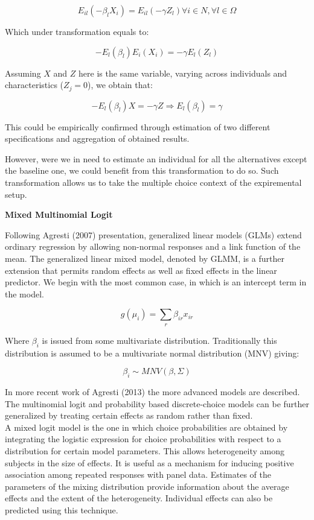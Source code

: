 \documentclass[12pt,]{article}
\begin{document}
\begin{equation}
E_{il} (- \beta_l X_i) = E_{il} (- \gamma Z_l) \forall i \in N, \forall l \in \Omega
\end{equation}

Which under transformation equals to:

\begin{equation}
- E_{l} (\beta_l) E_{i} (X_i) = - \gamma E_{l} (Z_l)
\end{equation}

Assuming \(X\) and \(Z\) here is the same variable, varying across
individuals and characteristics (\(Z_j = 0\)), we obtain that:

\begin{equation}
- E_{l} (\beta_l) X = - \gamma Z \Rightarrow E_{l} (\beta_l) = \gamma
\end{equation}

This could be empirically confirmed through estimation of two different
specifications and aggregation of obtained results.

However, were we in need to estimate an individual for all the
alternatives except the baseline one, we could benefit from this
transformation to do so. Such transformation allows us to take the
multiple choice context of the expiremental setup.

\textbf{Mixed Multinomial Logit}

Following Agresti (2007) presentation, generalized linear models (GLMs)
extend ordinary regression by allowing non-normal responses and a link
function of the mean. The generalized linear mixed model, denoted by
GLMM, is a further extension that permits random effects as well as
fixed effects in the linear predictor. We begin with the most common
case, in which is an intercept term in the model.

\begin{equation}
g(\mu_i) = \sum_r \beta_{ir} x_{ir}
\end{equation}

Where \(\beta_i\) is issued from some multivariate distribution.
Traditionally this distribution is assumed to be a multivariate normal
distribution (MNV) giving:

\begin{equation}
\beta_i \sim MNV(\beta, \Sigma)
\end{equation}

In more recent work of Agresti (2013) the more advanced models are
described. The multinomial logit and probability based discrete-choice
models can be further generalized by treating certain effects as random
rather than fixed.\\
A mixed logit model is the one in which choice probabilities are
obtained by integrating the logistic expression for choice probabilities
with respect to a distribution for certain model parameters. This allows
heterogeneity among subjects in the size of effects. It is useful as a
mechanism for inducing positive association among repeated responses
with panel data. Estimates of the parameters of the mixing distribution
provide information about the average effects and the extent of the
heterogeneity. Individual effects can also be predicted using this
technique.
\end{document}
